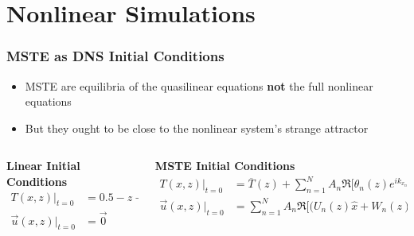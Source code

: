 \section{Nonlinear Simulations}
\begin{frame}[fragile]
    \frametitle{MSTE as DNS Initial Conditions}
    \begin{itemize}
        \item MSTE are equilibria of the quasilinear equations \textbf{not} the full nonlinear equations\newline
        
        \item But they ought to be close to the nonlinear system's strange attractor\newline
        
    \end{itemize}
    \begin{columns}[T]
        \begin{column}{.28\textwidth}
            \textbf{Linear Initial Conditions}
            \vspace{0.07\linewidth}
            \begin{align}
                T(x, z)\big|_{t=0} &= 0.5 - z + \mathcal{N} \nonumber \\
                \vec{u}(x, z)\big|_{t=0} &= \vec{0} \label{EQ:linear_ic}
            \end{align}            
        \end{column}
        \begin{column}{.28\textwidth}
            \textbf{MSTE Initial Conditions}
            \begin{align}
                T(x, z)\big|_{t=0} &= \overline{T}(z) + \sum_{n=1}^N  A_n \Re \Big[ \theta_n(z) e^{ik_{x_n}x} \Big] + \mathcal{N} \nonumber \\
                \vec{u}(x, z)\big|_{t=0} &= \sum_{n=1}^N A_n \Re \Big[\Big( U_n (z) \hat{x} + W_n(z) \hat{z} \Big) e^{ik_{x_n}x} \Big] \label{EQ:mste_ic}
            \end{align}
        \end{column}
    \end{columns}
\end{frame}


